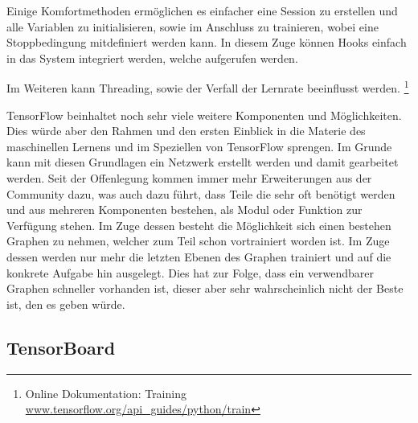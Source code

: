 \noindent
Einige Komfortmethoden ermöglichen es einfacher eine Session zu erstellen und alle Variablen zu initialisieren, sowie im Anschluss zu trainieren, wobei eine Stoppbedingung mitdefiniert werden kann.
In diesem Zuge können Hooks einfach in das System integriert werden, welche aufgerufen werden.

\noindent
Im Weiteren kann Threading, sowie der Verfall der Lernrate beeinflusst werden. \footnote{Online Dokumentation: Training \url{www.tensorflow.org/api_guides/python/train}}
\phantom \newline



\noindent
TensorFlow beinhaltet noch sehr viele weitere Komponenten und Möglichkeiten. 
Dies würde aber den Rahmen und den ersten Einblick in die Materie des maschinellen Lernens und im Speziellen von TensorFlow sprengen. 
Im Grunde kann mit diesen Grundlagen ein Netzwerk erstellt werden und damit gearbeitet werden. 
Seit der Offenlegung kommen immer mehr Erweiterungen aus der Community dazu, was auch dazu führt, dass Teile die sehr oft benötigt werden und aus mehreren Komponenten bestehen, als Modul oder Funktion zur Verfügung stehen. 
Im Zuge dessen besteht die Möglichkeit sich einen bestehen Graphen zu nehmen, welcher zum Teil schon vortrainiert worden ist. 
Im Zuge dessen werden nur mehr die letzten Ebenen des Graphen trainiert und auf die konkrete Aufgabe hin ausgelegt. 
Dies hat zur Folge, dass ein verwendbarer Graphen schneller vorhanden ist, dieser aber sehr wahrscheinlich nicht der Beste ist, den es geben würde. 

\subsection{TensorBoard}

